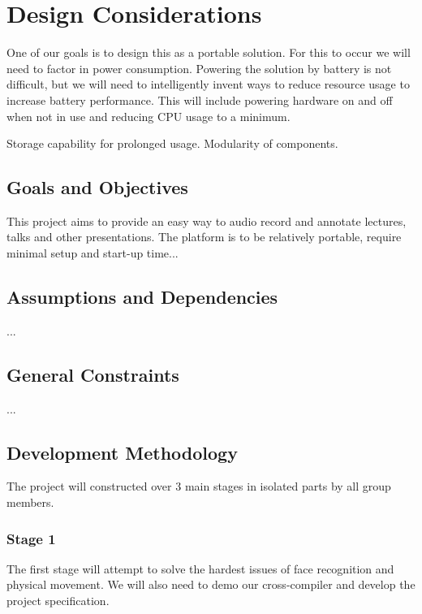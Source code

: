 \documentclass[11pt,a4paper,titlepage]{report}
\begin{document}
\section{Design Considerations}

One of our goals is to design this as a portable solution. For this to occur we will need to factor in power consumption. Powering the solution by battery is not difficult, but we will need to intelligently invent ways to reduce resource usage to increase battery performance. This will include powering hardware on and off when not in use and reducing CPU usage to a minimum. 

{\color{red} Storage capability for prolonged usage. Modularity of components.}


\subsection{Goals and Objectives}

This project aims to provide an easy way to audio record and annotate lectures, talks and other presentations. {\color{red}The platform is to be relatively portable, require minimal setup and start-up time...}

\subsection{Assumptions and Dependencies}

{\color{red}...}

\subsection{General Constraints}

{\color{red}...}

\subsection{Development Methodology}

The project will constructed over 3 main stages in isolated parts by all group members. 


\subsubsection{Stage 1}

The first stage will attempt to solve the hardest issues of face recognition and physical movement. We will also need to demo our cross-compiler and develop the project specification.
\end{document}

